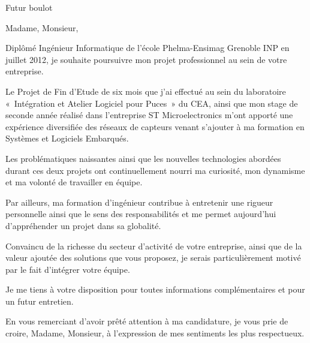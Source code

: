 \documentclass[12pt]{lettre}
\makeatletter
\newcommand*{\NoRule}{\renewcommand*{\rule@length}{0}}
\makeatother
\begin{document}
\begin{letter}{Futur boulot}

  \signature{Hoel IRIS}
  \address{Hoel IRIS\\
  28 place de l'An 2000\\
  77380 Combs-la-ville\\
  Tel : 06 18 39 30 11\\
  E-Mail : hoel.iris@gmail.com}
  \NoRule
  \notelephone
  \nofax


    \opening{Madame, Monsieur,}
    
    Diplômé Ingénieur Informatique de l’école Phelma-Ensimag Grenoble INP en juillet 2012, je souhaite poursuivre mon projet professionnel au sein de votre entreprise.

    Le Projet de Fin d’Etude de six mois que j’ai effectué au sein du laboratoire « Intégration et Atelier Logiciel pour Puces » du CEA, ainsi que mon  stage de seconde année réalisé dans l’entreprise ST Microelectronics m’ont apporté une expérience diversifiée des réseaux de capteurs venant s’ajouter à ma formation en Systèmes et Logiciels Embarqués. 

    Les problématiques naissantes ainsi que les nouvelles technologies abordées durant ces deux projets ont continuellement nourri ma curiosité, mon dynamisme et ma volonté de travailler en équipe. 

    Par ailleurs, ma formation d’ingénieur contribue à entretenir une rigueur personnelle ainsi que le sens des responsabilités et me permet aujourd’hui d’appréhender un projet dans sa globalité.

    Convaincu de la richesse du secteur d’activité de votre entreprise, ainsi que de la valeur ajoutée des solutions que vous proposez, je serais particulièrement motivé par le fait d’intégrer votre équipe. 

    Je me tiens à votre disposition pour toutes informations complémentaires et pour un futur entretien.

    
    \closing{En vous remerciant d’avoir prêté attention à ma candidature, je vous prie de croire, Madame, Monsieur, à l’expression de mes sentiments les plus respectueux.}
 
\end{letter}
 
\end{document}
